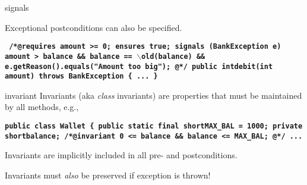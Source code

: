 \documentclass[
pdf,
nocolorBG,
slideColor,
erik,
]{prosper}
\newcommand{\code}[1]{{\rm \texttt{\textbf{\small #1}}}}
\newcommand{\old}     {\(\backslash\)old}
\begin{document}
\begin{slide}{signals}
\vspace*{-4ex}

{\blue Exceptional postconditions} can also be specified.
\vspace*{-1ex}
\begin{alltt}
\code{
{\green /*@}{\black requires} amount >= 0;
    {\black ensures}  true;
    {\blue signals (BankException e) 
               amount > balance         &&
               balance == \old(balance) &&
               e.getReason().equals("Amount too big");}
{\green   @*/}
  public int{\green debit}(int amount) throws BankException \{ 
   ...
  \}
}
\end{alltt} %

\end{slide}


\begin{slide}{invariant}
\vspace*{-4ex}
{\blue Invariants} (aka {\em class} invariants) are properties that
must be maintained by all methods, e.g.,
\begin{alltt}
\code{public class {\green Wallet} \{
  public static final short{\green MAX_BAL} = 1000;
  private short{\green balance};
  {\green /*@}{\blue invariant 0 <= balance &&
                      balance <= MAX_BAL;}
  {\green   @*/}
  ...  }
\end{alltt} %

Invariants are implicitly included in all pre- and postconditions.

Invariants must {\em also} be preserved if exception is thrown!
\end{slide}
\end{document}

